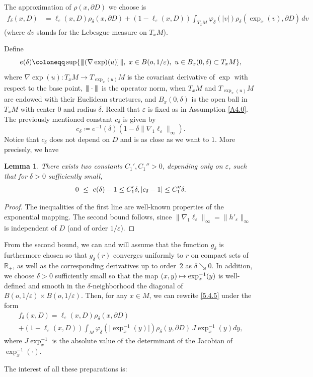\documentclass[JEP,XML,SOM,Unicode,NoFloatCountersInSection,published]{cedram}
\newcommand{\vvvert}{|\mkern-2mu|\mkern-2mu|}
\newcommand\mto{\mathchoice{\longmapsto}{\mapsto}{\mapsto}{\mapsto}}
\theoremstyle{plain}
\newtheorem{lemma}[thm]{Lemma}
\theoremstyle{definition}
\newcommand{\RR}{{\mathbb R}}
\newcommand\df{\coloneqq}
\newcommand{\bq}{\begin{equation*}}
\newcommand{\bqn}[1]{\begin{equation}\label{#1}}
\newcommand{\eq}{\end{equation*}}
\newcommand{\eqn}{\end{equation}}
\let\d\delta
\let\e\varepsilon
\let\n\nabla
\begin{document}
The approximation of $\rho(x,\partial D)$ we choose is
\begin{equation}
\label{5.4.5}
\begin{split}
f_\d(x,D)&=\ell_\e(x,D)\rho_\d(x,\partial D)+(1-\ell_\e(x,D))\int_{T_xM}\varphi_\d(\vert v\vert)\rho_\d(\exp_x(v),\partial D)\, dv
\end{split}
\end{equation}
(where $dv$ stands for the Lebesgue measure on $T_xM$).
\par
Define
\bq
e(\d)\df \sup\{\vvvert (\nabla\exp)(u)]\vvvert,\ x\in B(o,1/\e),\ u\in B_x(0,\d)\subset T_xM\},
\eq
where $\nabla\exp(u): T_xM\to T_{\exp_x(u)}M$ is the covariant derivative of $\exp$ with respect to the base point, $\vvvert\cdot\vvvert$ is the operator norm, when $T_{x}M$ and $T_{\exp_x(u)}M$ are endowed with their Euclidean structures, and $B_x(0,\d)$ is the open ball in $T_xM$ with center $0$ and radius $\delta$. Recall that $\e$ is fixed as in Assumption \ref{A4.0}.
The previously mentioned constant $c_\delta$ is given by
\bqn{cdelta}
c_\delta\df e^{-1}(\d)(1-\d \|\n_1\ell_\e\|_\infty).
\eqn
Notice that $c_\d$ does not depend on $D$ and is as close as we want to $1$.
More precisely, we have
\begin{lemma}
There exists two constants $C_1',C_1''>0$, depending only on $\e$, such that for $\delta>0$ sufficiently small,
\bq
0\ \le\ e(\d)- 1\le C_1'\d,\\
\vert c_\d-1\vert\leq C_1''\d.
\eq
\end{lemma}
\begin{proof}
The inequalities of the first line are well-known properties of the exponential mapping.
The second bound follows, since $\|\n_1\ell_\e\|_\infty=\|h'_\e\|_\infty$ is independent of $D$ (and of order $1/\e$).
\end{proof}
From the second bound, we can and will assume that the function $g_\d$ is furthermore chosen so that $g_\d(r)$ converges uniformly to $r$ on compact sets of $\RR_+$, as well as the corresponding derivatives up to order~$2$ as $\d\searrow 0$.
In addition, we choose $\d>0$ sufficiently small so that the map $(x,y)\mto \exp_x^{-1}(y)$ is well-defined and smooth in the $\d$-neighborhood the diagonal of $B(o,1/\e)\times B(o,1/\e)$.
Then, for any $x\in M$, we can rewrite \eqref{5.4.5} under the form
\begin{multline}
f_\d(x,D)
= \ell_\e(x,D)\rho_\d(x,\partial D)\\
+(1-\ell_\e(x,D))\int_{M}\varphi_\d(\vert \exp_x^{-1}(y)\vert )\rho_\d(y,\partial D)\, J\exp_x^{-1}(y) dy,
\end{multline}
where $J\exp_x^{-1}$ is the absolute value of the determinant of the Jacobian of $\exp_x^{-1}(\cdot)$.
\par
The interest of all these preparations is:
\end{document}
